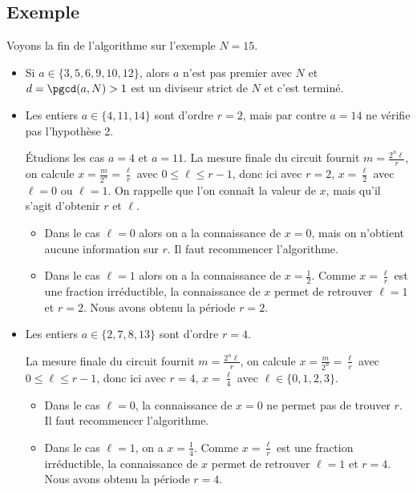 \documentclass[11pt,class=report,crop=false]{standalone}
\begin{document}
\subsection{Exemple}

Voyons la fin de l'algorithme sur l'exemple $N=15$.


\begin{itemize}
\item Si $a \in \{3,5,6,9,10,12\}$, alors
  $a$ n'est pas premier avec $N$ et $d = \pgcd(a,N)>1$ est un diviseur strict de $N$ et c'est terminé.
  
  
\item Les entiers $a \in \{4,11,14\}$ sont d'ordre $r=2$, mais par contre $a=14$ ne vérifie pas l'hypothèse 2. 
  
  \'Etudions les cas $a=4$ et $a=11$. La mesure finale du circuit fournit
  $m = \frac{2^n\ell}{r}$, on calcule $x=\frac{m}{2^n} = \frac{\ell}{r}$ avec $0\le \ell \le r-1$, 
  donc ici avec $r=2$, $x=\frac{\ell}{2}$ avec $\ell=0$ ou $\ell=1$. On rappelle que l'on connaît la valeur de $x$, mais qu'il s'agit d'obtenir $r$ et $\ell$.
  \begin{itemize}
  \item Dans le cas $\ell=0$ alors on a la connaissance de $x=0$, mais on n'obtient aucune information sur $r$. Il faut recommencer l'algorithme.
  \item Dans le cas $\ell=1$ alors on a la connaissance de $x=\frac12$. Comme $x= \frac{\ell}{r}$ est une fraction irréductible, la connaissance de $x$ permet de retrouver $\ell=1$ et $r=2$. Nous avons obtenu la période $r=2$. 
  \end{itemize}
  
  
\item Les entiers $a \in \{2,7,8,13\}$ sont d'ordre $r=4$.
  
La mesure finale du circuit fournit
  $m = \frac{2^n\ell}{r}$, on calcule $x=\frac{m}{2^n} = \frac{\ell}{r}$ avec $0\le \ell \le r-1$, 
  donc ici avec $r=4$, $x=\frac{\ell}{4}$ avec $\ell \in \{0,1,2,3\}$. 
  \begin{itemize}
  \item Dans le cas $\ell=0$, la connaissance de $x=0$ ne permet pas de trouver $r$. Il faut recommencer l'algorithme.
    
  \item Dans le cas $\ell=1$, on a $x=\frac14$. Comme $x= \frac{\ell}{r}$ est une fraction irréductible, la connaissance de $x$ permet de retrouver $\ell=1$ et $r=4$. Nous avons obtenu la période $r=4$. 
    

\end{itemize}
\end{itemize}
\end{document}
